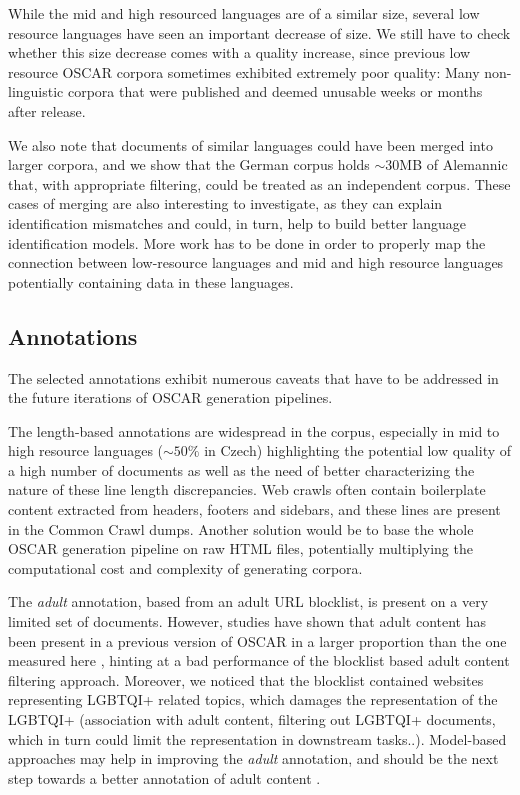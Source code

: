 While the mid and high resourced languages are of a similar size, several low resource languages have seen an important decrease of size.
We still have to check whether this size decrease comes with a quality increase, since previous low resource OSCAR corpora sometimes exhibited extremely poor quality: Many non-linguistic corpora that were published and deemed unusable weeks or months after release.

We also note that documents of similar languages could have been merged into larger corpora, and we show that the German corpus holds $\sim 30$MB of Alemannic that, with appropriate filtering, could be treated as an independent corpus. These cases of merging are also interesting to investigate, as they can explain identification mismatches and could, in turn, help to build better language identification models.
More work has to be done in order to properly map the connection between low-resource languages and mid and high resource languages potentially containing data in these languages.

\subsection{Annotations}

The selected annotations exhibit numerous caveats that have to be addressed in the future iterations of OSCAR generation pipelines.

The length-based annotations are widespread in the corpus, especially in mid to high resource languages ($\sim50\%$ in Czech) highlighting the potential low quality of a high number of documents as well as the need of better characterizing the nature of these line length discrepancies. Web crawls often contain boilerplate content extracted from headers, footers and sidebars, and these lines are present in the Common Crawl dumps.
Another solution would be to base the whole OSCAR generation pipeline on raw HTML files, potentially multiplying the computational cost and complexity of generating corpora.

The \textit{adult} annotation, based from an adult URL blocklist, is present on a very limited set of documents. However, studies have shown that adult content has been present in a previous version of OSCAR in a larger proportion than the one measured here \cite{kreutzer-etal-2021-quality}, hinting at a bad performance of the blocklist based adult content filtering approach. Moreover, we noticed that the blocklist contained websites representing LGBTQI+ related topics, which damages the representation of the LGBTQI+ (association with adult content, filtering out LGBTQI+ documents, which in turn could limit the representation in downstream tasks..).
Model-based approaches may help in improving the \textit{adult} annotation, and should be the next step towards a better annotation of adult content \cite{luccioni-viviano-2021-whats}.

